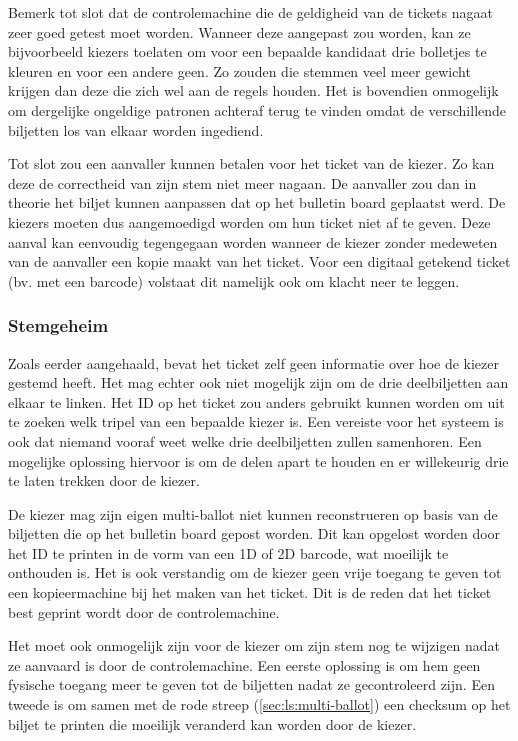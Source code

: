 \npar Bemerk tot slot dat de controlemachine die de geldigheid van de tickets nagaat zeer goed getest moet worden. Wanneer deze aangepast zou worden, kan ze bijvoorbeeld kiezers toelaten om voor een bepaalde kandidaat drie bolletjes te kleuren en voor een andere geen. Zo zouden die stemmen veel meer gewicht krijgen dan deze die zich wel aan de regels houden. Het is bovendien onmogelijk om dergelijke ongeldige patronen achteraf terug te vinden omdat de verschillende biljetten los van elkaar worden ingediend.

\npar Tot slot zou een aanvaller kunnen betalen voor het ticket van de kiezer. Zo kan deze de correctheid van zijn stem niet meer nagaan. De aanvaller zou dan in theorie het biljet kunnen aanpassen dat op het bulletin board geplaatst werd. De kiezers moeten dus aangemoedigd worden om hun ticket niet af te geven. Deze aanval kan eenvoudig tegengegaan worden wanneer de kiezer zonder medeweten van de aanvaller een kopie maakt van het ticket. Voor een digitaal getekend ticket (bv. met een barcode) volstaat dit namelijk ook om klacht neer te leggen.

\subsubsection{Stemgeheim}

Zoals eerder aangehaald, bevat het ticket zelf geen informatie over hoe de kiezer gestemd heeft. Het mag echter ook niet mogelijk zijn om de drie deelbiljetten aan elkaar te linken. Het ID op het ticket zou anders gebruikt kunnen worden om uit te zoeken welk tripel van een bepaalde kiezer is. Een vereiste voor het systeem is ook dat niemand vooraf weet welke drie deelbiljetten zullen samenhoren. Een mogelijke oplossing hiervoor is om de delen apart te houden en er willekeurig drie te laten trekken door de kiezer.

\npar De kiezer mag zijn eigen multi-ballot niet kunnen reconstrueren op basis van de biljetten die op het bulletin board gepost worden. Dit kan opgelost worden door het ID te printen in de vorm van een 1D of 2D barcode, wat moeilijk te onthouden is. Het is ook verstandig om de kiezer geen vrije toegang te geven tot een kopieermachine bij het maken van het ticket. Dit is de reden dat het ticket best geprint wordt door de controlemachine.

\npar Het moet ook onmogelijk zijn voor de kiezer om zijn stem nog te wijzigen nadat ze aanvaard is door de controlemachine. Een eerste oplossing is om hem geen fysische toegang meer te geven tot de biljetten nadat ze gecontroleerd zijn. Een tweede is om samen met de rode streep (\ref{sec:ls:multi-ballot}) een checksum op het biljet te printen die moeilijk veranderd kan worden door de kiezer.

